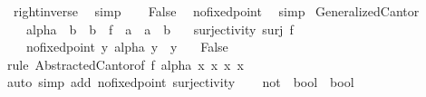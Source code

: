 \begin{isabellebody}
\ right{\isacharunderscore}{\kern0pt}inverse\ \isamarkupfalse%
\ simp\isanewline
\ \ \isamarkupfalse%
\ {\isachardoublequoteopen}False{\isachardoublequoteclose}\ \isamarkupfalse%
\ no{\isacharunderscore}{\kern0pt}fixed{\isacharunderscore}{\kern0pt}point\ \isamarkupfalse%
\ simp\isanewline
{}\isamarkupfalse%
%
\endisatagproof
{\isafoldproof}%
%
\isadelimproof
\isanewline
%
\endisadelimproof
\isanewline
\isanewline
\isanewline
{}\isamarkupfalse%
\ {\isachardoublequoteopen}Generalized{\isacharunderscore}{\kern0pt}Cantor{\isachardoublequoteclose}{\isacharcolon}{\kern0pt}\isanewline
\ \ \ alpha\ {\isacharcolon}{\kern0pt}{\isacharcolon}{\kern0pt}\ {\isachardoublequoteopen}{\isacharprime}{\kern0pt}b\ {\isasymRightarrow}\ {\isacharprime}{\kern0pt}b{\isachardoublequoteclose}\ \ f\ {\isacharcolon}{\kern0pt}{\isacharcolon}{\kern0pt}\ {\isachardoublequoteopen}{\isacharprime}{\kern0pt}a\ {\isasymRightarrow}\ {\isacharprime}{\kern0pt}a\ {\isasymRightarrow}\ {\isacharprime}{\kern0pt}b{\isachardoublequoteclose}\isanewline
\ \ \ surjectivity{\isacharcolon}{\kern0pt}\ {\isachardoublequoteopen}surj\ f{\isachardoublequoteclose}\isanewline
\ \ \ no{\isacharunderscore}{\kern0pt}fixed{\isacharunderscore}{\kern0pt}point{\isacharcolon}{\kern0pt}\ {\isachardoublequoteopen}{\isasymforall}y{\isachardot}{\kern0pt}\ alpha\ y\ {\isasymnoteq}\ y{\isachardoublequoteclose}\isanewline
\ \ \ {\isachardoublequoteopen}False{\isachardoublequoteclose}\isanewline
%
\isadelimproof
\isanewline
\ \ %
\endisadelimproof
%
\isatagproof
{}\isamarkupfalse%
{\isacharparenleft}{\kern0pt}rule\ Abstracted{\isacharunderscore}{\kern0pt}Cantor{\isacharbrackleft}{\kern0pt}of\ f\ alpha\ {\isachardoublequoteopen}{\isasymlambda}x{\isachardot}{\kern0pt}\ x{\isachardoublequoteclose}\ {\isachardoublequoteopen}{\isasymlambda}x{\isachardot}{\kern0pt}\ x{\isachardoublequoteclose}{\isacharbrackright}{\kern0pt}{\isacharparenright}{\kern0pt}\isanewline
\ \ \isamarkupfalse%
{\isacharparenleft}{\kern0pt}auto\ simp\ add{\isacharcolon}{\kern0pt}\ no{\isacharunderscore}{\kern0pt}fixed{\isacharunderscore}{\kern0pt}point\ surjectivity{\isacharparenright}{\kern0pt}\isanewline
\ \ \isamarkupfalse%
%
\endisatagproof
{\isafoldproof}%
%
\isadelimproof
\isanewline
%
\endisadelimproof
\isanewline
\isanewline
\isanewline
{}\isamarkupfalse%
\ not\ {\isacharcolon}{\kern0pt}{\isacharcolon}{\kern0pt}\ {\isachardoublequoteopen}bool\ {\isasymRightarrow}\ bool{\isachardoublequoteclose}\ \isanewline

\end{isabellebody}
